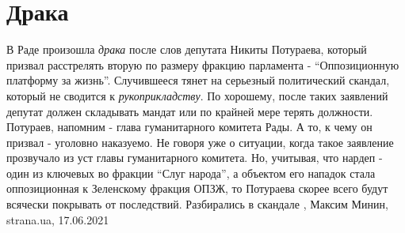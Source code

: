  
 
 
 
 
\chapter{Драка}
\label{sec:slova.draka}

В Раде произошла \emph{драка} после слов депутата Никиты Потураева, который призвал
расстрелять вторую по размеру фракцию парламента - \enquote{Оппозиционную
платформу за жизнь}.  Случившееся тянет на серьезный политический скандал,
который не сводится к \emph{рукоприкладству}.  По хорошему, после таких заявлений
депутат должен складывать мандат или по крайней мере терять должности.
Потураев, напомним - глава гуманитарного комитета Рады. А то, к чему он призвал
- уголовно наказуемо. Не говоря уже о ситуации, когда такое заявление
прозвучало из уст главы гуманитарного комитета.  Но, учитывая, что нардеп -
один из ключевых во фракции \enquote{Слуг народа}, а объектом его нападок стала
оппозиционная к Зеленскому фракция ОПЗЖ, то Потураева скорее всего будут
всячески покрывать от последствий.  Разбирались в скандале
, 
Максим Минин, strana.ua, 17.06.2021

